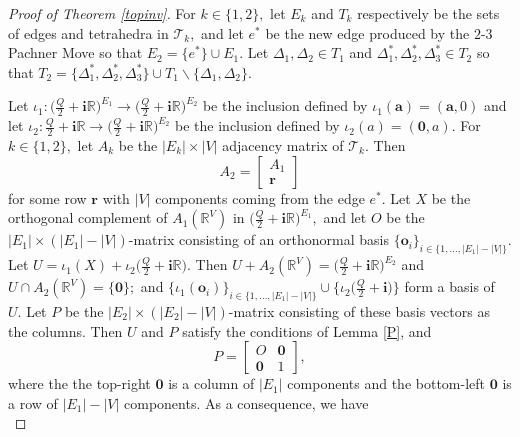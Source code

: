 \documentclass[11pt]{article}
\renewcommand{\setminus}{{\smallsetminus}}
\theoremstyle{remark}
\theoremstyle{remark}
\numberwithin{equation}{section}
\begin{document}
\begin{proof}[Proof of Theorem \ref{topinv}]
For $k\in \{1,2\},$ let $E_k$ and $T_k$ respectively be the sets of edges and tetrahedra in $\mathcal T_k,$ and let $e^*$ be the new edge produced by the $2$-$3$ Pachner Move so that $E_2=\{e^*\}\cup E_1.$ Let $\Delta_1,\Delta_2\in T_1$ and $\Delta_1^*,\Delta_2^*,\Delta_3^*\in T_2$ so that $T_2=\{\Delta_1^*,\Delta_2^*,\Delta_3^*\}\cup T_1 \setminus \{\Delta_1,\Delta_2\}.$ 

Let $\iota_1: \big(\frac{Q}{2}+\mathbf i\mathbb R\big)^{E_1}\to \big(\frac{Q}{2}+\mathbf i\mathbb R\big)^{E_2}$ be the inclusion  defined by $\iota_1(\boldsymbol a)=(\boldsymbol a, 0)$
 and let $\iota_2: \frac{Q}{2}+\mathbf i\mathbb R \to \big(\frac{Q}{2}+\mathbf i\mathbb R\big)^{E_2}$ be the inclusion  defined by $\iota_2(a)=(\boldsymbol 0,a).$ 
For $k\in\{1,2\},$ let $A_k$ be the $|E_k|\times |V|$ adjacency matrix of $\mathcal T_k.$ Then 
\begin{equation}\label{A2}
    A_2= \left[\begin{matrix}
 A_1 \\
 \boldsymbol r
\end{matrix}\right]
\end{equation} for some row  $\boldsymbol r$ with $|V|$ components coming from the edge $e^*.$ Let $X$ be the orthogonal complement of $A_1(\mathbb R^V)$ in $\big(\frac{Q}{2}+\mathbf i\mathbb R\big)^{E_1},$ and let $O$ be the $|E_1|\times(|E_1|-|V|)$-matrix consisting of an orthonormal basis $\{\boldsymbol o_i\}_{i\in\{1,\dots,|E_1|-|V|\}}.$
Let $U=\iota_1(X)+\iota_2\big(\frac{Q}{2}+\mathbf i\mathbb R\big).$ Then $U+A_2(\mathbb R^V)=\big(\frac{Q}{2}+\mathbf i\mathbb R\big)^{E_2}$ and $U\cap A_2(\mathbb R^V)=\{\boldsymbol 0\};$ and $\{\iota_1(\boldsymbol o_i)\}_{i\in \{1,\dots,|E_1|-|V|\}}\cup \{\iota_2\big(\frac{Q}{2}+\mathbf i\big)\}$ form a basis of $U.$ Let $P$ be the $|E_2|\times(|E_2|-|V|)$-matrix consisting of these basis vectors as the columns. Then $U$ and $P$ satisfy the conditions of Lemma \ref{P}, and
\begin{equation}\label{PO1}
P=\left[\begin{matrix}
    O & \boldsymbol 0\\
    \boldsymbol 0& 1
\end{matrix}\right],    
\end{equation}
where the the top-right $\boldsymbol 0$ is a column of $|E_1|$ components and the bottom-left $\boldsymbol 0$ is a row of $|E_1|-|V|$ components. As a consequence, we have  
\begin{equation}\label{detPTP}

\end{equation}
\end{proof}
\end{document}
